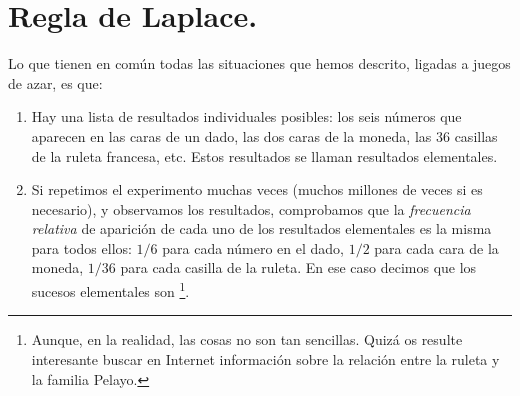 \section{Regla de Laplace.}
\label{cap03:sec:ReglaLaplace}

Lo que tienen en común todas las situaciones que hemos descrito, ligadas a juegos de azar, es que:
        \begin{enumerate}
            \item Hay una lista de resultados individuales posibles: los seis números que aparecen en las caras de un dado, las dos caras de la moneda, las 36 casillas de la ruleta francesa, etc. Estos resultados se llaman {\sf resultados elementales}.
            \item Si repetimos el experimento muchas veces (muchos millones de veces si es
                necesario), y observamos los resultados, comprobamos que la {\em frecuencia
                relativa} de aparición de cada uno de los resultados elementales es la misma para
                todos ellos: $1/6$ para cada número en el dado, $1/2$ para cada cara de la
                moneda, $1/36$ para cada casilla de la ruleta. En ese caso decimos que los
                sucesos elementales son \footnote{Aunque, en la realidad, las cosas no son tan sencillas.
                Quizá os resulte interesante buscar en Internet información sobre la relación
                entre la ruleta y la familia Pelayo.}.
        \end{enumerate}

